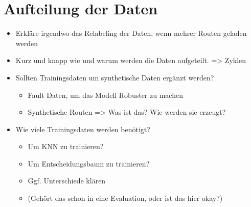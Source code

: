 \section{Aufteilung der Daten}
\begin{itemize}
    \item Erkläre irgendwo das Relabeling der Daten, wenn mehrer Routen geladen werden
    \item Kurz und knapp wie und warum werden die Daten aufgeteilt. => Zyklen
    \item Sollten Trainingsdaten um synthetische Daten ergänzt werden?
    \begin{itemize}
        \item Fault Daten, um das Modell Robuster zu machen
        \item Synthetische Routen => Was ist das? Wie werden sie erzeugt?
    \end{itemize}
    \item Wie viele Trainingsdaten werden benötigt?
    \begin{itemize}
        \item Um KNN zu trainieren?
        \item Um Entscheidungsbaum zu trainieren?
        \item Ggf. Unterschiede klären
        \item (Gehört das schon in eine Evaluation, oder ist das hier okay?)
    \end{itemize}
\end{itemize}